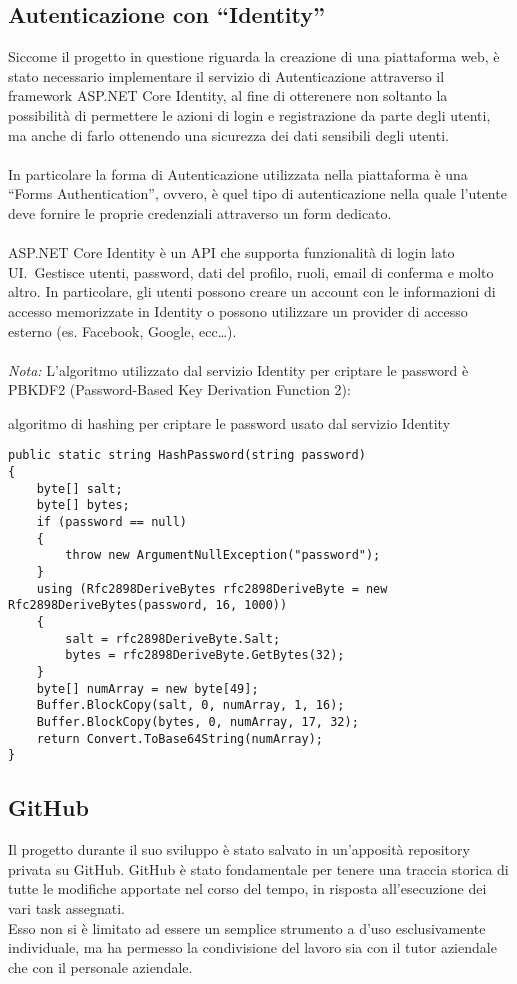 \subsection{Autenticazione con ``Identity''}\label{sec:cap_sec_subsec}
Siccome il progetto in questione riguarda la creazione di una piattaforma web, è stato necessario
implementare il servizio di Autenticazione attraverso il framework ASP.NET Core Identity, al
fine di otterenere non soltanto la possibilità di permettere le azioni di login e registrazione da parte degli utenti, ma
anche di farlo ottenendo una sicurezza dei dati sensibili degli utenti. 
\\ \\
In particolare la forma di Autenticazione utilizzata nella piattaforma è una ``Forms Authentication'', ovvero, è quel tipo di
autenticazione nella quale l'utente deve fornire le proprie credenziali attraverso un form dedicato. 
\\ \\
ASP.NET Core Identity è un API che supporta funzionalità di login lato UI.\ Gestisce utenti,
password, dati del profilo, ruoli, email di conferma e molto altro.
In particolare, gli utenti possono creare un account con le informazioni di accesso memorizzate in Identity 
o possono utilizzare un provider di accesso esterno (es. Facebook, Google, ecc\dots ).
\\ \\
\textit{Nota:} L'algoritmo utilizzato dal servizio Identity per criptare le password è PBKDF2 (Password-Based Key Derivation Function 2):
\begin{algorithm}[H]
	\caption{algoritmo di hashing per criptare le password usato dal servizio Identity}
	\label{lst:genic_mpi}
	\begin{lstlisting}[label=lst:test]
public static string HashPassword(string password)
{
    byte[] salt;
    byte[] bytes;
    if (password == null)
    {
        throw new ArgumentNullException("password");
    }
    using (Rfc2898DeriveBytes rfc2898DeriveByte = new Rfc2898DeriveBytes(password, 16, 1000))
    {
        salt = rfc2898DeriveByte.Salt;
        bytes = rfc2898DeriveByte.GetBytes(32);
    }
    byte[] numArray = new byte[49];
    Buffer.BlockCopy(salt, 0, numArray, 1, 16);
    Buffer.BlockCopy(bytes, 0, numArray, 17, 32);
    return Convert.ToBase64String(numArray);
}
    \end{lstlisting}
\end{algorithm}



\subsection{GitHub}\label{sec:cap_sec_subsec}
Il progetto durante il suo sviluppo è stato salvato in un'apposità repository privata
su GitHub.
GitHub è stato fondamentale per tenere una traccia storica di tutte le
modifiche apportate nel corso del tempo, in risposta all'esecuzione dei vari task assegnati. \\
Esso non si è limitato ad essere un semplice strumento a d'uso esclusivamente
individuale, ma ha permesso la condivisione del lavoro sia con il tutor 
aziendale che con il personale aziendale.
